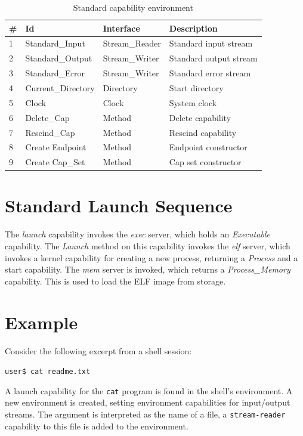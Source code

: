 \begin{table}[ht]
\begin{tabular}{l l l l}
\hline\hline
\# & Id & Interface & Description \\
\hline
1 & Standard\_Input & Stream\_Reader & Standard input stream \\
2 & Standard\_Output & Stream\_Writer & Standard output stream \\
3 & Standard\_Error & Stream\_Writer & Standard error stream \\
4 & Current\_Directory & Directory & Start directory \\
5 & Clock & Clock & System clock \\
6 & Delete\_Cap & Method & Delete capability \\
7 & Rescind\_Cap & Method & Rescind capability \\
8 & Create Endpoint & Method & Endpoint constructor \\
9 & Create Cap\_Set & Method & Cap set constructor \\
\hline
\end{tabular}
\caption{Standard capability environment}
\label{table:standard-cap-env}
\end{table}

\section{Standard Launch Sequence}

The {\em launch} capability invokes the {\em exec} server, which holds an {\em Executable} capability.  
The {\em Launch} method on this capability invokes the {\em elf} server,
which invokes a kernel capability for creating a new process, returning a {\em Process} and a start capability.
The {\em mem} server is invoked, which returns a {\em Process\_Memory} capability.
This is used to load the ELF image from storage.

\section{Example}

Consider the following excerpt from a shell session:

{\tt user\$ cat readme.txt }

A launch capability for the {\tt cat} program is found in the shell's environment.  A new environment is created, setting environment capabilities for input/output streams.  The argument is interpreted as the name of a file, a {\tt stream-reader} capability to this file is added to the environment.

